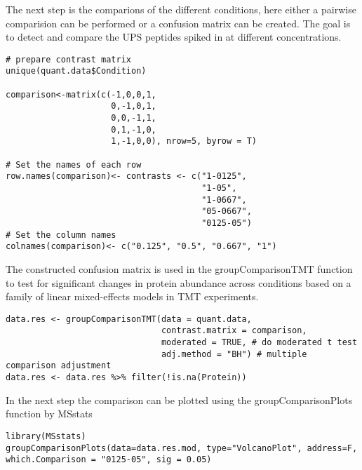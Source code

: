 \noindent The next step is the comparions of the different conditions, here either a pairwise comparision can be performed or a confusion matrix can be created. The goal is to detect and compare the UPS peptides spiked in at different concentrations. 

\begin{listing}
\begin{verbatim}
# prepare contrast matrix
unique(quant.data$Condition)

comparison<-matrix(c(-1,0,0,1,
                     0,-1,0,1,
                     0,0,-1,1,
                     0,1,-1,0,
                     1,-1,0,0), nrow=5, byrow = T)
                     
# Set the names of each row
row.names(comparison)<- contrasts <- c("1-0125",   
                                       "1-05",  
                                       "1-0667",
                                       "05-0667",
                                       "0125-05")
# Set the column names
colnames(comparison)<- c("0.125", "0.5", "0.667", "1")

\end{verbatim}
\end{listing}

\noindent The constructed confusion matrix is used in the groupComparisonTMT function to test for significant changes in protein abundance across conditions based on a family of linear mixed-effects models in TMT experiments. 

\begin{listing}
\begin{verbatim}
data.res <- groupComparisonTMT(data = quant.data, 
                               contrast.matrix = comparison,
                               moderated = TRUE, # do moderated t test
                               adj.method = "BH") # multiple comparison adjustment
data.res <- data.res %>% filter(!is.na(Protein))
\end{verbatim}
\end{listing}

\noindent  In the next step the comparison can be plotted using the groupComparisonPlots function by MSstats

\begin{listing}
\begin{verbatim}
library(MSstats)
groupComparisonPlots(data=data.res.mod, type="VolcanoPlot", address=F, which.Comparison = "0125-05", sig = 0.05)
\end{verbatim}
\end{listing}

